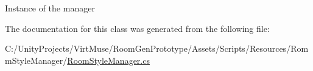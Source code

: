 Instance of the manager 



The documentation for this class was generated from the following file\+:\begin{DoxyCompactItemize}
\item 
C\+:/\+Unity\+Projects/\+Virt\+Muse/\+Room\+Gen\+Prototype/\+Assets/\+Scripts/\+Resources/\+Romm\+Style\+Manager/\mbox{\hyperlink{_room_style_manager_8cs}{Room\+Style\+Manager.\+cs}}\end{DoxyCompactItemize}
